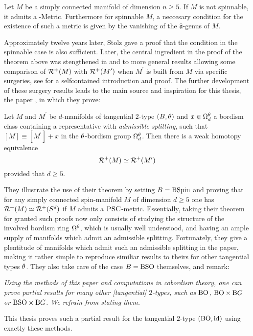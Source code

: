 \begin{theorem*}
    Let $M$ be a simply connected manifold of dimension $n \geq 5$. If $M$ is not spinnable, it admits a \psc-Metric. Furthermore for spinnable $M$, a neccesary condition for the existence of such a metric is given by the vanishing of the $\hat{\mathfrak{a}}$-genus of $M$.
\end{theorem*}
Approximately twelve years later, Stolz gave a proof \cite{sto:suf} that the condition in the spinnable case is also sufficient.
Later, the central ingredient in the proof of the theorem above was stengthened in \cite{cher:sur} and \cite{kord:sur} to more general results allowing some comparison of $\mathcal{R}^+(M)$ with $\mathcal{R}^+(M^\prime)$ when $M^\prime$ is built from $M$ via specific surgeries, see \cite{georg:diss} for a selfcontained introduction and proof.
The further development of these surgery results leads to the main source and inspiration for this thesis, the paper \cite{ew:psc}, in which they prove:
\begin{theorem*}
    Let $M$ and $M^\prime$ be $d$-manifolds of tangential $2$-type $(B,\theta)$ and $x\in \Omega_d^\theta$ a bordism class containing a representative with \emph{admissible splitting}, such that $[M] \equiv [M^\prime] + x$ in the $\theta$-bordism group $\Omega_d^\theta$. 
    Then there is a weak homotopy equivalence
    \begin{equation*}
        \mathcal{R}^+(M) \simeq \mathcal{R}^+(M^\prime)
    \end{equation*}
    provided that $d\geq 5$.
\end{theorem*}
They illustrate the use of their theorem by setting $B = \mathrm{BSpin}$ and proving that for any simply connected spin-manifold $M$ of dimension $d\geq 5$ one has $\mathcal{R}^+(M) \simeq \mathcal{R}^+(S^d)$ if $M$ admits a $\textsc{PSC}$-metric.
Essentially, taking their theorem for granted such proofs now only consists of studying the structure of the involved bordism ring $\Omega^\theta$, which is usually well understood, and having an ample supply of manifolds which admit an admissible splitting.
Fortunately, they give a plentitude of manifolds which admit such an admissible splitting in the paper, making it rather simple to reproduce similiar results to theirs for other tangential types $\theta$.
They also take care of the case $B = \mathrm{BSO}$ themselves, and remark:
\begin{displayquote}\itshape
    Using the methods of this paper and computations in cobordism theory, one can prove partial results for many other [tangential] $2$-types, such as $\mathrm{BO}$, $\mathrm{BO}\times\mathrm{B} G$ or $\mathrm{BSO}\times\mathrm{B} G$. We refrain from stating them.
\end{displayquote}
This thesis proves such a partial result for the tangential $2$-type $(\mathrm{BO},\operatorname{id})$ using exactly these methods. 
\pagebreak{}

